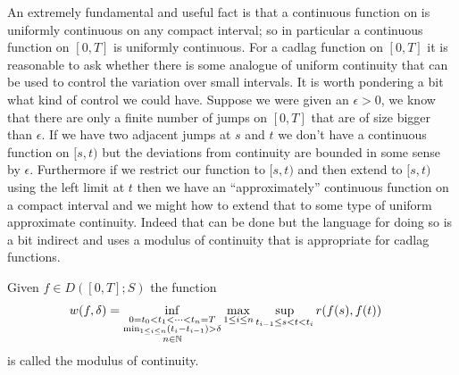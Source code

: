 An extremely fundamental and useful fact is that a continuous function on is uniformly continuous on any compact interval;
so in particular a continuous function on $[0,T]$ is uniformly continuous.  For a cadlag function on $[0,T]$ it is reasonable to 
ask whether there is some analogue of uniform continuity that can be used to control the variation over small intervals.  It is worth
pondering a bit what kind of control we could have.  Suppose we were given an $\epsilon > 0$, we know that there are only a finite number of
jumps on $[0,T]$ that are of size bigger than $\epsilon$.  If we have two adjacent jumps at $s$ and $t$  we don't have a continuous function on $[s,t)$ 
but the deviations from continuity are bounded in some sense by $\epsilon$.  Furthermore if we restrict our function to $[s,t)$ and then extend to
$[s,t)$ using the left limit at $t$ then we have an ``approximately'' continuous function on a compact interval and we might how to extend that
to some type of uniform approximate continuity.  Indeed that can be done but the language for doing so is a bit indirect and uses a modulus of continuity
that is appropriate for cadlag functions.

\begin{defn}Given $f \in D([0,T];S)$ the function
\begin{align*}
w(f,\delta) &= \inf_{\substack{0=t_0 < t_1 < \dotsb < t_n = T \\
  \min_{1 \leq i \leq n} (t_i - t_{i-1}) > \delta \\ n \in \mathbb{N}}}
\max_{1 \leq i \leq n} \sup_{t_{i-1} \leq s < t < t_i} r(f(s), f(t))
\end{align*}
is called the modulus of continuity.
\end{defn}


